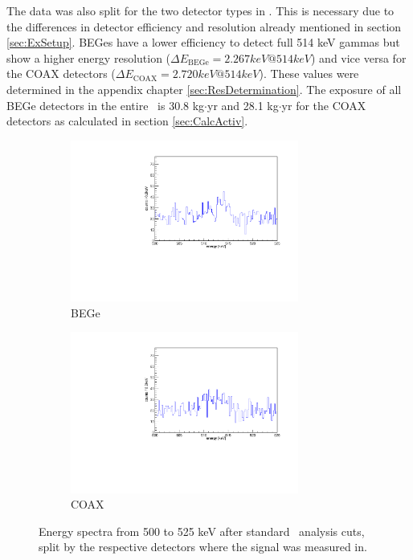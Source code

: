 \documentclass[encoding=utf8,british]{tumphthesis}
\begin{document}
The data was also split for the two detector types in \gerda.
This is necessary due to the differences in detector efficiency and resolution already mentioned in section \ref{sec:ExSetup}.
BEGes have a lower efficiency to detect full 514 keV gammas but show a higher energy resolution ($\Delta E_{\mathrm{BEGe}} = 2.267\unit{keV}  @ 514 \unit{keV}$) and vice versa for the COAX detectors ($\Delta E_{\mathrm{COAX}} = 2.720\unit{keV} @ 514 \unit{keV}$).
These values were determined in the appendix chapter \ref{sec:ResDetermination}.
The exposure of all BEGe detectors in the entire \PII\ is 30.8 kg$\cdot$yr and 28.1 kg$\cdot$yr for the COAX detectors as calculated in section \ref{sec:CalcActiv}.
\\

\begin{figure}[t!]
\centering
\begin{subfigure}{.475\textwidth}
  \centering
	\includegraphics[width=75mm]{./Bilder/500525NoFilterBEGes.pdf}

  \caption{BEGe}
    \label{fig:NoFilterBEGes}
\end{subfigure}\hfill%
\begin{subfigure}{.475\textwidth}
  \centering
	\includegraphics[width=75mm]{./Bilder/500525NoFilterCOAX.pdf}
  \caption{COAX}
  \label{fig:NoFilterCOAX}
\end{subfigure}
	\caption{Energy spectra from 500 to 525 keV after standard \gerda\ analysis cuts, split by the respective detectors where the signal was measured in.}
\end{figure}
\end{document}
